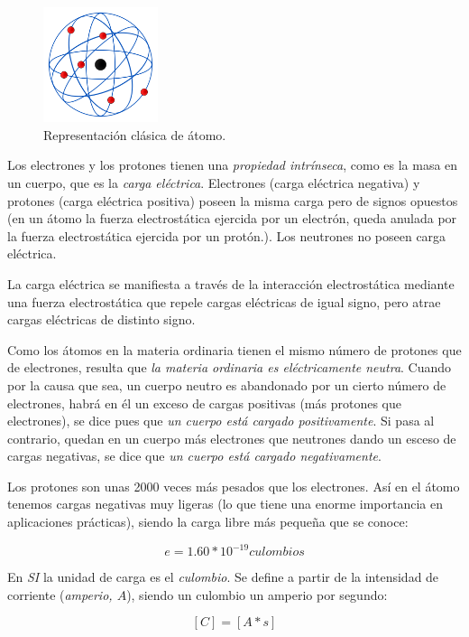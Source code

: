 \documentclass[11pt, oneside, titlepage]{article}
\begin{document}
\begin{figure}[htp]
\centering
\includegraphics[width=0.3\textwidth]{resources/repatomo.png}
\caption{Representación clásica de átomo.}
\label{}
\end{figure}

Los electrones y los protones tienen una \emph{propiedad intrínseca}, como es la masa en un cuerpo, que es la \emph{carga eléctrica}. Electrones (carga eléctrica negativa) y protones (carga eléctrica positiva) poseen la misma carga pero de signos opuestos (en un átomo la fuerza electrostática ejercida por un electrón, queda anulada por la fuerza electrostática ejercida por un protón.). Los neutrones no poseen carga eléctrica. 

La carga eléctrica se manifiesta a través de la interacción electrostática mediante una fuerza electrostática que repele cargas eléctricas de igual signo, pero atrae cargas eléctricas de distinto signo. 

Como los átomos en la materia ordinaria tienen el mismo número de protones que de electrones, resulta que \emph{la materia ordinaria es eléctricamente neutra}. Cuando por la causa que sea, un cuerpo neutro es abandonado por un cierto número de electrones, habrá en él un exceso de cargas positivas (más protones que electrones), se dice pues que \emph{un cuerpo está cargado positivamente}. Si pasa al contrario, quedan en un cuerpo más electrones que neutrones dando un esceso de cargas negativas, se dice que \emph{un cuerpo está cargado negativamente}.

Los protones son unas 2000 veces más pesados que los electrones. Así en el átomo tenemos cargas negativas muy ligeras (lo que tiene una enorme importancia en aplicaciones prácticas), siendo la carga libre más pequeña que se conoce:

\[
e = 1.60 * 10^{-19} culombios
\]

En \emph{SI} la unidad de carga es el \emph{culombio}. Se define a partir de la intensidad de corriente (\emph{amperio, $A$}), siendo un culombio un amperio por segundo:

\[
[C] = [A*s]
\]
\end{document}
